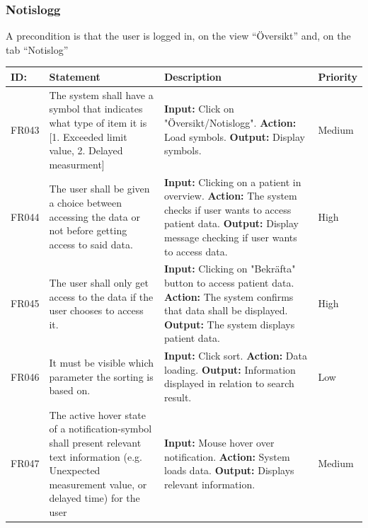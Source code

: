 \documentclass{scrreprt}
\begin{document}
\subsubsection{Notislogg}
A precondition is that the user is logged in, on the view “Översikt” and, on the tab “Notislog”
\begin{center}
\begin{tabularx}{\linewidth}{| l | X | X | l |}
\hline
\textbf{ID:} & \textbf{Statement} & \textbf{Description} & \textbf{Priority} \\ 
\hline
FR043 & The system shall have a symbol that indicates what type of item it is [1. Exceeded limit value, 2. Delayed measurment] & \textbf{Input:} Click on "Översikt/Notislogg".
\newline \textbf{Action:} Load symbols.
\newline \textbf{Output:} Display symbols. & Medium \\
\hline
FR044 & The user shall be given a choice between accessing the data or not before getting access to said data. & \textbf{Input:} Clicking on a patient in overview.
\newline \textbf{Action:} The system checks if user wants to access patient data.
\newline \textbf{Output:} Display message checking if user wants to access data. & High \\
\hline
FR045 & The user shall only get access to the data if the user chooses to access it. & \textbf{Input:} Clicking on "Bekräfta" button to access patient data.
\newline \textbf{Action:} The system confirms that data shall be displayed.
\newline \textbf{Output:} The system displays patient data. & High \\ 
\hline
FR046 & It must be visible which parameter the sorting is based on. & \textbf{Input:} Click sort.
\newline \textbf{Action:} Data loading.
\newline \textbf{Output:} Information displayed in relation to search result. & Low \\ 
\hline
FR047 & The active hover state of a notification-symbol shall present relevant text information (e.g. Unexpected measurement value, or delayed time) for the user   & \textbf{Input:} Mouse hover over notification.
\newline \textbf{Action:} System loads data.
\newline \textbf{Output:} Displays relevant information. & Medium \\ 

\end{tabularx}
\end{center}
\end{document}
